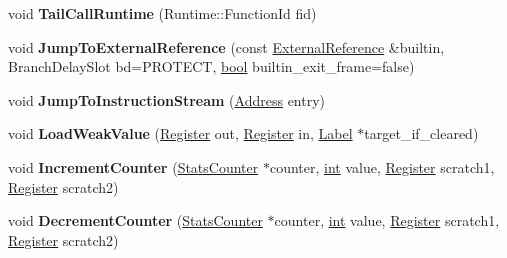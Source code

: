 \begin{DoxyCompactItemize}
void {\bfseries Tail\+Call\+Runtime} (Runtime\+::\+Function\+Id fid)
\item 
\mbox{\label{classv8_1_1internal_1_1MacroAssembler_ae92373db89a768d12fe7ba88d23282df}} 
void {\bfseries Jump\+To\+External\+Reference} (const \mbox{\hyperlink{classv8_1_1internal_1_1ExternalReference}{External\+Reference}} \&builtin, Branch\+Delay\+Slot bd=P\+R\+O\+T\+E\+CT, \mbox{\hyperlink{classbool}{bool}} builtin\+\_\+exit\+\_\+frame=false)
\item 
\mbox{\label{classv8_1_1internal_1_1MacroAssembler_a18fc118dd1ecc3b59755acce49880671}} 
void {\bfseries Jump\+To\+Instruction\+Stream} (\mbox{\hyperlink{classuintptr__t}{Address}} entry)
\item 
\mbox{\label{classv8_1_1internal_1_1MacroAssembler_ab142a904bdb8e7d16e762655774c5284}} 
void {\bfseries Load\+Weak\+Value} (\mbox{\hyperlink{classv8_1_1internal_1_1Register}{Register}} out, \mbox{\hyperlink{classv8_1_1internal_1_1Register}{Register}} in, \mbox{\hyperlink{classv8_1_1internal_1_1Label}{Label}} $\ast$target\+\_\+if\+\_\+cleared)
\item 
\mbox{\label{classv8_1_1internal_1_1MacroAssembler_a7a18bd522429bd7c7f20cd2a4325249d}} 
void {\bfseries Increment\+Counter} (\mbox{\hyperlink{classv8_1_1internal_1_1StatsCounter}{Stats\+Counter}} $\ast$counter, \mbox{\hyperlink{classint}{int}} value, \mbox{\hyperlink{classv8_1_1internal_1_1Register}{Register}} scratch1, \mbox{\hyperlink{classv8_1_1internal_1_1Register}{Register}} scratch2)
\item 
\mbox{\label{classv8_1_1internal_1_1MacroAssembler_a989b426fe1ff4cb41c77b21f849fb370}} 
void {\bfseries Decrement\+Counter} (\mbox{\hyperlink{classv8_1_1internal_1_1StatsCounter}{Stats\+Counter}} $\ast$counter, \mbox{\hyperlink{classint}{int}} value, \mbox{\hyperlink{classv8_1_1internal_1_1Register}{Register}} scratch1, \mbox{\hyperlink{classv8_1_1internal_1_1Register}{Register}} scratch2)
\item 
\mbox{\label{classv8_1_1internal_1_1MacroAssembler_a74b4779456ca00de03d435930010cc7d}} 

\end{DoxyCompactItemize}
